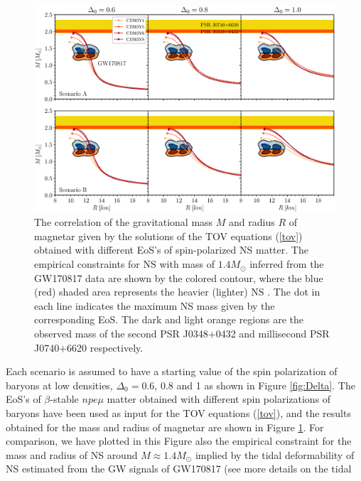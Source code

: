 \begin{figure}[ht!]
        \centering
        \includegraphics[width=\textwidth]{fig/MR.eps}
        \caption{The correlation of the gravitational mass $M$ and radius $R$ of magnetar 
            given by the solutions of the \gls{TOV} equations (\ref{tov}) obtained with different 
            EoS's of spin-polarized \gls{NS} matter. The empirical constraints for \gls{NS} with 
				mass of $1.4M_\odot$ inferred from the GW170817 data are shown by the colored contour,
				where the blue (red) shaded area represents the heavier (lighter) \gls{NS} 
				\citep{abbott2018gw170817}. The dot in each line indicates the maximum \gls{NS} 
				mass given by the corresponding EoS. The dark and light orange regions are the observed
				mass of the second \gls{PSR} J0348+0432 \citep{antoniadis2013massive} and 
				millisecond \gls{PSR} J0740+6620 \citep{cromartie2020relativistic} respectively.}
        \label{fig:mr}
\end{figure} 
Each scenario is assumed to have a starting value of the spin polarization of baryons 
at low densities, $\Delta_0 = 0.6$, $0.8$ and 1 as shown in Figure \ref{fig:Delta}.
The EoS's of $\beta$-stable $npe\mu$ matter obtained with different spin polarizations of 
baryons have been used as input for the \gls{TOV} equations (\ref{tov}), and the results obtained 
for the mass and radius of magnetar are shown in Figure \ref{fig:mr}. For comparison, we
have plotted in this Figure also the empirical constraint for the mass and radius of \gls{NS} 
around $M\approx 1.4 M_\odot$ implied by the tidal deformability of \gls{NS} estimated from 
the \gls{GW} signals of GW170817 \citep{abbott2018gw170817} (see more details on the tidal 
